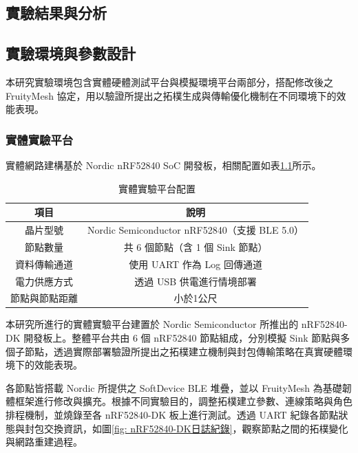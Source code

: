 \begin{ZhChapter}

\chapter{實驗結果與分析}

\section{實驗環境與參數設計}

本研究實驗環境包含實體硬體測試平台與模擬環境平台兩部分，搭配修改後之 FruityMesh 協定，用以驗證所提出之拓樸生成與傳輸優化機制在不同環境下的效能表現。

\subsection{實體實驗平台}
實體網路建構基於 Nordic nRF52840 SoC 開發板，相關配置如表\ref{tab: 實體實驗平台配置}所示。

\begin{table}[H]
\centering
\caption{實體實驗平台配置}
\label{tab: 實體實驗平台配置}
\begin{tabular}{|c|c|}
    \hline
    項目 & 說明 \\ 
    \hline
    晶片型號 & Nordic Semiconductor nRF52840（支援 BLE 5.0） \\
    \hline
    節點數量 & 共 6 個節點（含 1 個 Sink 節點） \\
    \hline
    資料傳輸通道 & 使用 UART 作為 Log 回傳通道 \\
    \hline
    電力供應方式 & 透過 USB 供電進行情境部署 \\
    \hline
    節點與節點距離 & 小於1公尺 \\
    \hline
\end{tabular}
\end{table}

本研究所進行的實體實驗平台建置於 Nordic Semiconductor 所推出的 nRF52840-DK 開發板上。整體平台共由 6 個 nRF52840 節點組成，分別模擬 Sink 節點與多個子節點，透過實際部署驗證所提出之拓樸建立機制與封包傳輸策略在真實硬體環境下的效能表現。

各節點皆搭載 Nordic 所提供之 SoftDevice BLE 堆疊，並以 FruityMesh 為基礎韌體框架進行修改與擴充。根據不同實驗目的，調整拓樸建立參數、連線策略與角色排程機制，並燒錄至各 nRF52840-DK 板上進行測試。透過 UART 紀錄各節點狀態與封包交換資訊，如圖\ref{fig: nRF52840-DK日誌紀錄}，觀察節點之間的拓樸變化與網路重建過程。


\end{ZhChapter}
